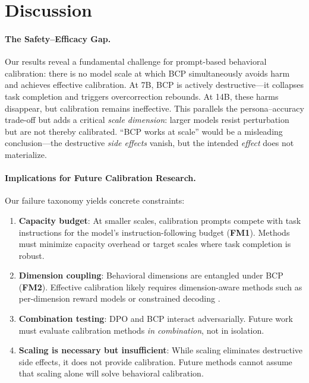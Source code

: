 \documentclass[11pt]{article}
\newcommand{\fm}[1]{\textbf{FM#1}}
\begin{document}
\section{Discussion}

\paragraph{The Safety--Efficacy Gap.}
Our results reveal a fundamental challenge for prompt-based behavioral calibration: there is no model scale at which BCP simultaneously avoids harm and achieves effective calibration. At 7B, BCP is actively destructive---it collapses task completion and triggers overcorrection rebounds. At 14B, these harms disappear, but calibration remains ineffective. This parallels the persona--accuracy trade-off \citep{basil2025playing_pretend, hu2026expert_persona} but adds a critical \emph{scale dimension}: larger models resist perturbation but are not thereby calibrated. ``BCP works at scale'' would be a misleading conclusion---the destructive \emph{side effects} vanish, but the intended \emph{effect} does not materialize.

\paragraph{Implications for Future Calibration Research.}
Our failure taxonomy yields concrete constraints:
\begin{enumerate}
    \item \textbf{Capacity budget}: At smaller scales, calibration prompts compete with task instructions for the model's instruction-following budget (\fm{1}). Methods must minimize capacity overhead or target scales where task completion is robust.
    \item \textbf{Dimension coupling}: Behavioral dimensions are entangled under BCP (\fm{2}). Effective calibration likely requires dimension-aware methods such as per-dimension reward models or constrained decoding \citep{khan2026decoding}.
    \item \textbf{Combination testing}: DPO and BCP interact adversarially. Future work must evaluate calibration methods \emph{in combination}, not in isolation.
    \item \textbf{Scaling is necessary but insufficient}: While scaling eliminates destructive side effects, it does not provide calibration. Future methods cannot assume that scaling alone will solve behavioral calibration.
\end{enumerate}
\end{document}
